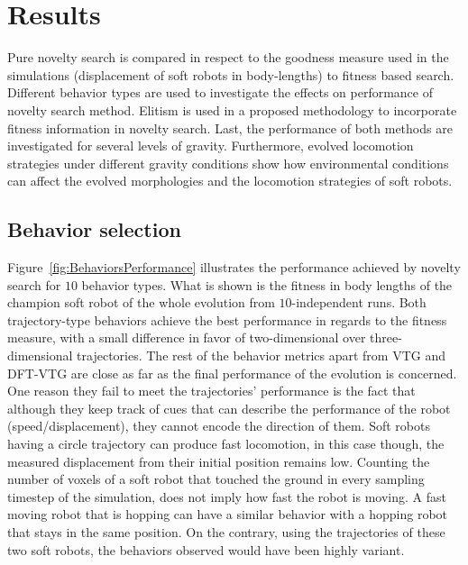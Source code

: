 \documentclass{sig-alternate}
\begin{document}
\section{Results}
Pure novelty search is compared in respect to the goodness measure used in the simulations (displacement of soft robots in body-lengths) to fitness based search. Different behavior types are used to investigate the effects on performance of novelty search method. Elitism is used in a proposed methodology to incorporate fitness information in novelty search. Last, the performance of both methods are investigated for several levels of gravity. Furthermore, evolved locomotion strategies under different gravity conditions show how environmental conditions can affect the evolved morphologies and the locomotion strategies of soft robots.


\subsection{Behavior selection} 

Figure~\ref{fig:BehaviorsPerformance} illustrates the performance achieved by novelty search for $10$ behavior types. What is shown is the fitness in body lengths of the champion soft robot of the whole evolution from $10$-independent runs. Both trajectory-type behaviors achieve the best performance in regards to the fitness measure, with a small difference in favor of two-dimensional over three-dimensional trajectories. The rest of the behavior metrics apart from VTG and DFT-VTG are close as far as the final performance of the evolution is concerned. One reason they fail to meet the trajectories' performance is the fact that although they keep track of cues that can describe the performance of the robot (speed/displacement), they cannot encode the direction of them. Soft robots having a circle trajectory can produce fast locomotion, in this case though, the measured displacement from their initial position remains low. Counting the number of voxels of a soft robot that touched the ground in every sampling timestep of the simulation, does not imply how fast the robot is moving. A fast moving robot that is hopping can have a similar behavior with a hopping robot that stays in the same position. On the contrary, using the trajectories of these two soft robots, the behaviors observed would have been highly variant.
\end{document}
